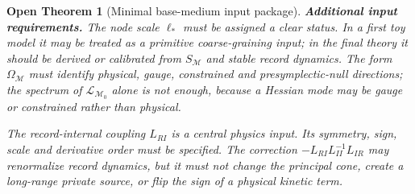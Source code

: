 \documentclass[11pt]{article}
\newtheorem{openthm}{Open Theorem}
\begin{document}
\begin{openthm}[Minimal base-medium input package]
\medskip\noindent\textbf{Additional input requirements.}
The node scale \(\ell_*\) must be assigned a clear status.  In a first toy
model it may be treated as a primitive coarse-graining input; in the final
theory it should be derived or calibrated from \(S_{\mathcal M}\) and stable
record dynamics.  The form \(\Omega_{\mathcal M}\) must identify physical,
gauge, constrained and presymplectic-null directions; the spectrum of
\(\mathcal L_{\mathcal M_0}\) alone is not enough, because a Hessian mode may
be gauge or constrained rather than physical.

The record-internal coupling \(L_{RI}\) is a central physics input.  Its
symmetry, sign, scale and derivative order must be specified.  The correction
\(-L_{RI}L_{II}^{-1}L_{IR}\) may renormalize record dynamics, but it must not
change the principal cone, create a long-range private source, or flip the
sign of a physical kinetic term.
\end{openthm}
\end{document}
